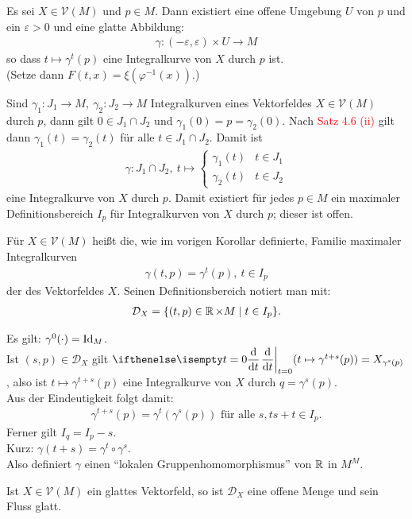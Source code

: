 \begin{kor}
  Es sei $X \in \mathcal V(M)$ und $p \in M$. Dann existiert eine offene Umgebung $U$ von $p$ und ein $\varepsilon > 0$ und eine glatte Abbildung:
  \begin{align*}
    \gamma\colon(-\varepsilon,\varepsilon) \times U \to M
  \end{align*}
so dass $t \mapsto \gamma^t(p)$ eine Integralkurve von $X$ durch $p$ ist.\\
(Setze dann $F(t,x) = \xi(\varphi^{-1}(x))$.)
\end{kor}

\begin{kor}
Sind $\gamma_1 \colon J_1 \to M, \ \gamma_2 \colon J_2 \to M$ Integralkurven eines Vektorfeldes $X \in \mathcal V(M)$ durch $p$, dann gilt $0 \in J_1 \cap J_2$ und $\gamma_1(0)= p = \gamma_2(0)$.
Nach \textcolor{red}{Satz 4.6 (ii)} %
gilt dann $\gamma_1(t) = \gamma_2(t)$ für alle $t \in J_1 \cap J_2$. Damit ist
\begin{align*}
  \gamma \colon J_1 \cap J_2, \ t \mapsto 
  \begin{cases}
    \gamma_1(t) & t \in J_1\\
\gamma_2(t) & t \in J_2
  \end{cases}
\end{align*}
eine Integralkurve von $X$ durch $p$.
Damit existiert für jedes $p \in M$ ein maximaler Definitionsbereich $I_p$ für Integralkurven von $X$ durch $p$; dieser ist offen.
\end{kor}

\begin{dfn*}
  Für $X \in \mathcal V(M)$ heißt die, wie im vorigen Korollar definierte, Familie maximaler Integralkurven
  \begin{align*}
    \gamma(t,p) = \gamma^t(p),\ t \in I_p
  \end{align*}
der  des Vektorfeldes $X$.
Seinen Definitionsbereich notiert man mit:
\begin{align*}
  \mathcal D_X = \{(t,p) \in \operatorname{\mathbb{R}} \times M \mid t \in I_p\}.
\end{align*}
\end{dfn*}

\begin{bem*}
  Es gilt: $\gamma^0(\cdot) = \operatorname{Id}_M$.\\
Ist $(s,p) \in \mathcal D_{X}$ gilt $\difffrac[t=0]{}{t}(t \mapsto \gamma^{t+s}(p)) = X_{\gamma^s(p)}$, also ist $t \mapsto \gamma^{t+s}(p)$ eine Integralkurve von $X$ durch $q = \gamma^s(p)$.\\
Aus der Eindeutigkeit folgt damit:
\begin{align*}
  \gamma^{t+s}(p) = \gamma^t(\gamma^s(p)) \text{ für alle } s,t s+t \in I_p.
\end{align*}
Ferner gilt $I_q = I_p - s$.\\

Kurz: $\gamma(t+s) = \gamma^t \circ \gamma^s$.\\
Also definiert $\gamma$ einen "`lokalen Gruppenhomomorphismus"' von $\operatorname{\mathbb{R}}$ in $M^M$.
\end{bem*}


\begin{satz}
  Ist $X \in \mathcal V(M)$ ein glattes Vektorfeld, so ist $\mathcal D_X$ eine offene Menge und sein Fluss glatt.
\end{satz}

